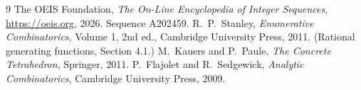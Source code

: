 \documentclass[11pt,a4paper]{article}
\theoremstyle{plain}
\theoremstyle{definition}
\begin{document}
\begin{thebibliography}{9}
 The OEIS Foundation, \emph{The On-Line Encyclopedia of Integer
Sequences}, \url{https://oeis.org}, 2026. Sequence A202459.
 R.~P.~Stanley, \emph{Enumerative Combinatorics}, Volume 1, 2nd ed.,
Cambridge University Press, 2011. (Rational generating functions, Section 4.1.)
 M.~Kauers and P.~Paule, \emph{The Concrete Tetrahedron}, Springer, 2011.
 P.~Flajolet and R.~Sedgewick, \emph{Analytic Combinatorics}, Cambridge
University Press, 2009.
\end{thebibliography}
\end{document}
